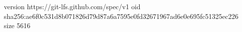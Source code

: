 version https://git-lfs.github.com/spec/v1
oid sha256:ae6f0c531d8b071826d79d87a6a7595e0fd32671967ad6e0e695fc51325ec226
size 5616
